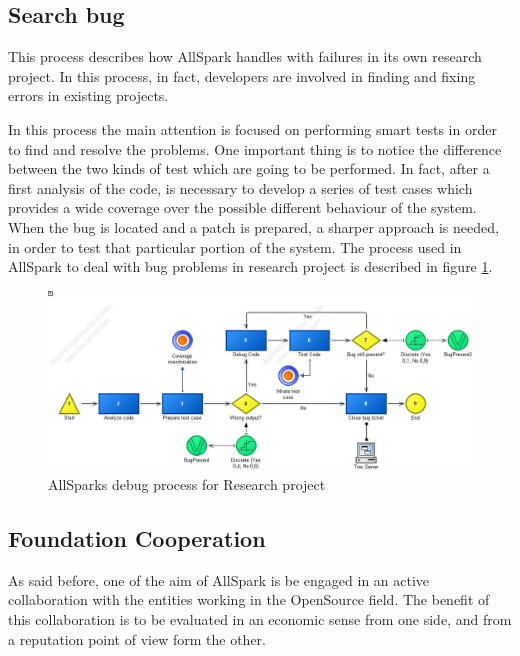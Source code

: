 \subsection{Search bug}
This process describes how AllSpark handles with failures in its own
research project. In this process, in fact, developers are involved in
finding and fixing errors in existing projects.

In this process the main attention is focused on performing smart tests in
order to find and resolve the problems. One important thing is to notice
the difference between the two kinds of test which are going to be
performed.
In fact, after a first analysis of the code, is necessary to develop a
series of test cases which provides a wide coverage over the possible
different behaviour of the system. When the bug is located and a patch is
prepared, a sharper approach is needed, in order to test that particular
portion of the system. The process used in AllSpark to deal with bug
problems in research project is described in figure \ref{2img:search_bug}.

\begin{figure}[!ht]
\begin{centering}
\includegraphics[scale=0.50, angle=90]{assign2/adonis/imgs/debug.jpg}
\caption{AllSparks debug process for Research project}
\label{2img:search_bug}
\end{centering}
\end{figure}

\subsection{Foundation Cooperation}
As said before, one of the aim of AllSpark is be engaged in an active
collaboration with the entities working in the OpenSource field. The
benefit of this collaboration is to be evaluated in an economic sense from
one side, and from a reputation point of view form the other.

